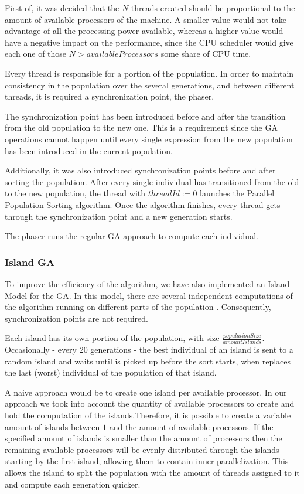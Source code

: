 \documentclass[runningheads]{llncs}
\begin{document}
First of, it was decided that the \(N\) threads created should be proportional to the amount of available processors of the machine. A smaller value would not take advantage of all the processing power available, whereas a higher value would have a negative impact on the performance, since the CPU scheduler would give each one of those \(N > availableProcessors\) some share of CPU time.

Every thread is responsible for a portion of the population. In order to maintain consistency in the population over the several generations, and between different threads, it is required a synchronization point, the phaser. 

The synchronization point has been introduced before and after the transition from the old population to the new one. This is a requirement since the GA operations cannot happen until every single expression from the new population has been introduced in the current population.

Additionally, it was also introduced synchronization points before and after sorting the population. After every single individual has transitioned from the old to the new population, the thread with \(threadId := 0\) launches the \hyperref[subsubsec:parallelSort]{Parallel Population Sorting} algorithm. Once the algorithm finishes, every thread gets through the synchronization point and a new generation starts.

The phaser runs the regular GA approach to compute each individual.

\subsubsection{Island GA} \hfill \par
To improve the efficiency of the algorithm, we have also implemented an Island Model for the GA. In this model, there are several independent computations of the algorithm running on different parts of the population \cite{islandModelGA}. Consequently, synchronization points are not required.

Each island has its own portion of the population, with size  $\frac{populationSize}{amountIslands}$. Occasionally - every 20 generations - the best individual of an island is sent to a random island and waits until is picked up before the sort starts, when replaces the last (worst) individual of the population of that island.

A naive approach would be to create one island per available processor. In our approach we took into account the quantity of available processors to create and hold the computation of the islands.Therefore, it is possible to create a variable amount of islands between $1$ and the amount of available processors. If the specified amount of islands is smaller than the amount of processors then the remaining available processors will be evenly distributed through the islands - starting by the first island, allowing them to contain inner parallelization. This allows the island to split the population with the amount of threads assigned to it and compute each generation quicker.
\end{document}
